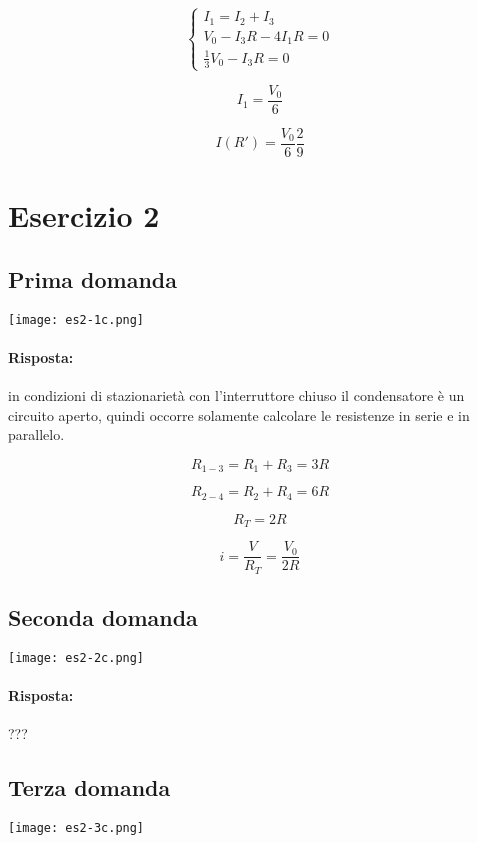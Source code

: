 \begin{equation}
  \begin{cases}
    I_1 = I_2 + I_3 \\
    V_0 - I_3 R - 4 I_1 R = 0\\
    \frac{1}{3} V_0 - I_3 R = 0
  \end{cases}
\end{equation}

$$I_1 = \frac{V_0}{6}$$

$$I(R') = \frac{V_0}{6} \frac{2}{9}$$

\section{Esercizio 2}

\subsection{Prima domanda}

\begin{center}
  \texttt{[image: es2-1c.png]}
\end{center}

\paragraph{Risposta:} in condizioni di stazionarietà con l'interruttore chiuso il condensatore è un circuito aperto, quindi occorre solamente calcolare le resistenze in serie e in parallelo. 

$$R_{1-3} = R_1 + R_3 = 3 R$$

$$R_{2-4} = R_2 + R_4 = 6 R$$

$$R_T = 2R$$ 

$$i = \frac{V}{R_T} = \frac{V_0}{2R}$$

\subsection{Seconda domanda}

\begin{center}
  \texttt{[image: es2-2c.png]}
\end{center}

\paragraph{Risposta:} ???

\subsection{Terza domanda}

\begin{center}
  \texttt{[image: es2-3c.png]}
\end{center}

